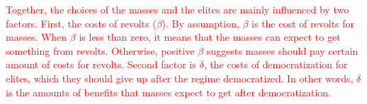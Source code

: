 \documentclass[11pt]{article}
\begin{document}



\textcolor{red}{Together, the choices of the masses and the elites are mainly influenced by two factors. First, the costs of revolts ($\beta$). By assumption, $\beta$ is the cost of revolts for masses. When $\beta$ is less than zero, it means that the masses can expect to get something from revolts. Otherwise, positive $\beta$ suggests masses should pay certain amount of costs for revolts. Second factor is $\delta$, the costs of democratization for elites, which they should give up after the regime democratized. In other words, $\delta$ is the amounts of benefits that masses expect to get after democratization.}
\end{document}
